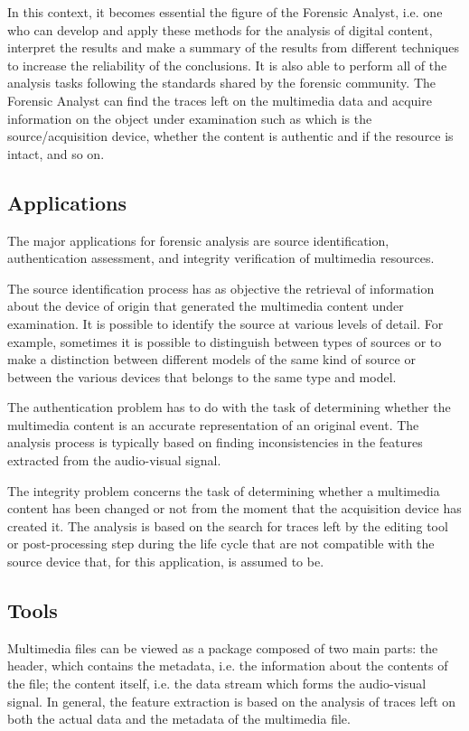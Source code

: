 In this context, it becomes essential the figure of the Forensic Analyst, i.e. one who can develop and apply these methods for the analysis of digital content, interpret the results and make a summary of the results from different techniques to increase the reliability of the conclusions. It is also able to perform all of the analysis tasks following the standards shared by the forensic community. The Forensic Analyst can find the traces left on the multimedia data and acquire information on the object under examination such as which is the source/acquisition device, whether the content is authentic and if the resource is intact, and so on.

\subsection{Applications}

The major applications for forensic analysis are source identification, authentication assessment, and integrity verification of multimedia resources.

The source identification process has as objective the retrieval of information about the device of origin that generated the multimedia content under examination. It is possible to identify the source at various levels of detail. For example, sometimes it is possible to distinguish between types of sources or to make a distinction between different models of the same kind of source or between the various devices that belongs to the same type and model.

The authentication problem has to do with the task of determining whether the multimedia content is an accurate representation of an original event. The analysis process is typically based on finding inconsistencies in the features extracted from the audio-visual signal.

The integrity problem concerns the task of determining whether a multimedia content has been changed or not from the moment that the acquisition device has created it. The analysis is based on the search for traces left by the editing tool or post-processing step during the life cycle that are not compatible with the source device that, for this application, is assumed to be.

\subsection{Tools}

Multimedia files can be viewed as a package composed of two main parts: the header, which contains the metadata, i.e. the information about the contents of the file; the content itself, i.e. the data stream which forms the audio-visual signal.
In general, the feature extraction is based on the analysis of traces left on both the actual data and the metadata of the multimedia file.

